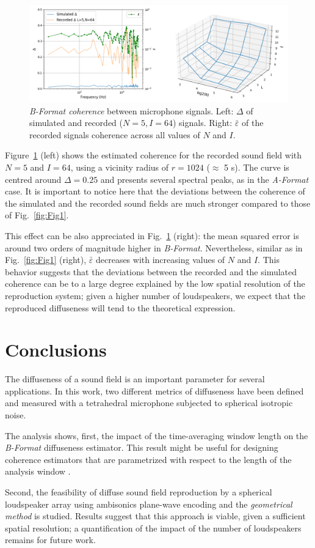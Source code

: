 \begin{figure}
	\includegraphics[width=\textwidth]{Figures/CoherenceEstimation/Figure3}
	\caption{\label{fig:Fig3}\textit{B-Format coherence} between microphone signals. Left: $\Delta$ of simulated and recorded ($N=5, I=64$) signals. Right: $\bar{\varepsilon}$ of the recorded signals coherence across all values of $N$ and $I$. }
\end{figure}

Figure~\ref{fig:Fig3} (left) shows the estimated coherence for the recorded sound field with $N=5$ and $I=64$, using a vicinity radius of $r=1024$ ($\approx$ 5 s).
The curve is centred around $\Delta=0.25$ and presents several spectral peaks, as in the \textit{A-Format} case. 
It is important to notice here that the deviations between the coherence of the simulated and the recorded sound fields are much stronger compared to those of Fig.~\ref{fig:Fig1}. 

This effect can be also appreciated in Fig.~\ref{fig:Fig3} (right): the mean squared error is around two orders of magnitude higher in \textit{B-Format}.
Nevertheless, similar as in Fig.~\ref{fig:Fig1} (right), $\bar{\varepsilon}$ decreases with increasing values of $N$ and $I$.
This behavior suggests that the deviations between the recorded and the simulated coherence can be to a large degree explained by the low spatial resolution of the reproduction system; given a higher number of loudspeakers, we expect that the reproduced diffuseness will tend to the theoretical expression.




\section{Conclusions}
The diffuseness of a sound field is an important parameter for several applications. In this work, two different metrics of diffuseness have been defined and measured with a tetrahedral microphone subjected to spherical isotropic noise.

The analysis shows, first, the impact of the time-averaging window length on the \textit{B-Format} diffuseness estimator.
This result might be useful for designing coherence estimators that are parametrized with respect to the length of the analysis window \cite{thiergart_diffuseness_2011}.

Second, the feasibility of diffuse sound field reproduction by a spherical loudspeaker array using ambisonics plane-wave encoding and the \textit{geometrical method} is studied. 
Results suggest that this approach is viable, given a sufficient spatial resolution; a quantification of the impact of the number of loudspeakers remains for future work.




